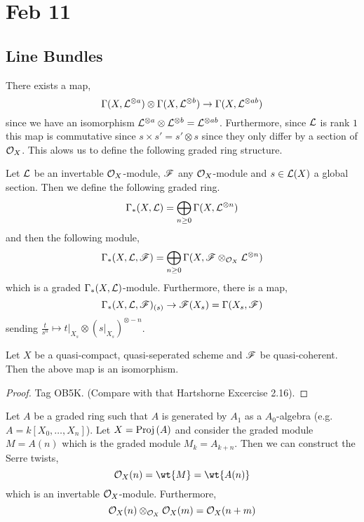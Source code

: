 \documentclass[12pt]{article}
\begin{document}
\section{Feb 11}

\subsection{Line Bundles}

There exists a map,
\[ \Gamma(X, \mathcal{L}^{\otimes a}) \otimes \Gamma(X, \mathcal{L}^{\otimes b}) \to \Gamma(X, \mathcal{L}^{\otimes ab}) \]
since we have an isomorphism $\mathcal{L}^{\otimes a} \otimes \mathcal{L}^{\otimes b} = \mathcal{L}^{\otimes ab}$. Furthermore, since $\mathcal{L}$ is rank $1$ this map is commutative since $s \times s' = s' \otimes s$ since they only differ by a section of $\mathcal{O}_{X}$. This alows us to define the following graded ring structure. 

\begin{definition}
Let $\mathcal{L}$ be an invertable $\mathcal{O}_{X}$-module, $\mathscr{F}$ any $\mathcal{O}_{X}$-module and $s \in \mathcal{L}(X)$ a global section. Then we define the following graded ring.
\[ \Gamma_*(X, \mathcal{L}) = \bigoplus_{n \ge 0} \Gamma(X, \mathcal{L}^{\otimes n}) \]
and then the following module,
\[ \Gamma_*(X, \mathcal{L}, \mathscr{F}) = \bigoplus_{n \ge 0} \Gamma(X, \mathscr{F} \otimes_{\mathcal{O}_{X}} \mathcal{L}^{\otimes n}) \]
which is a graded $\Gamma_*(X, \mathcal{L})$-module. Furthermore, there is a map,
\[ \Gamma_*(X, \mathcal{L}, \mathscr{F})_{(s)} \to \mathscr{F}(X_s) = \Gamma(X_s, \mathscr{F}) \]
sending $\frac{t}{s^n} \mapsto t|_{X_s} \otimes (s |_{X_s})^{\otimes -n}$. 
\end{definition}

\begin{proposition}
Let $X$ be a quasi-compact, quasi-seperated scheme and $\mathscr{F}$ be quasi-coherent. Then the above map is an isomorphism. 
\end{proposition}

\begin{proof}
Tag OB5K. (Compare with that Hartshorne Excercise 2.16).
\end{proof}

\begin{example}
Let $A$ be a graded ring such that $A$ is generated by $A_1$ as a $A_0$-algebra (e.g. $A = k[X_0, \dots, X_n]$). Let $X = \mathrm{Proj}\left( A \right)$ and consider the graded module $M = A(n)$ which is the graded module $M_{k} = A_{k + n}$. Then we can construct the Serre twists,
\[ \struct{X}(n) = \wt{M} = \wt{A(n)} \]
which is an invertable $\mathcal{O}_{X}$-module. Furthermore,
\[ \mathcal{O}_{X}(n) \otimes_{\mathcal{O}_{X}} \mathcal{O}_{X}(m) = \mathcal{O}_{X}(n + m) \]
\end{example}
\end{document}
